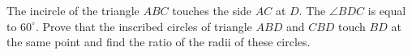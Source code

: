 \problem
The incircle of the triangle $ABC$ touches the side $AC$ at $D$. 
The $\angle{BDC}$ is equal to $60^{\circ}$. Prove that the inscribed circles of triangle $ABD$ and $CBD$ touch $BD$ at the same point and find the ratio of the radii of these circles.
\solution
\endproblem
